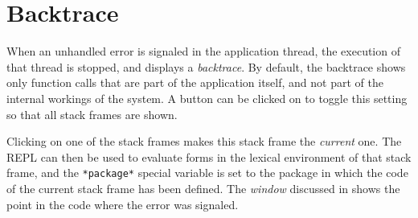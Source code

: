 \chapter{Backtrace}

When an unhandled error is signaled in the application thread, the
execution of that thread is stopped, and \sysname{} displays a
\emph{backtrace}.  By default, the backtrace shows only function calls
that are part of the application itself, and not part of the internal
workings of the \commonlisp{} system.  A button can be clicked on to
toggle this setting so that all stack frames are shown.

Clicking on one of the stack frames makes this stack frame the
\emph{current} one.  The \sysname{} REPL can then be used to evaluate
forms in the lexical environment of that stack frame, and the
\texttt{*package*} special variable is set to the package in which the
code of the current stack frame has been defined.  The
\emph{\stoppingpoint{} window} discussed in
 shows the point in the code where
the error was signaled.

